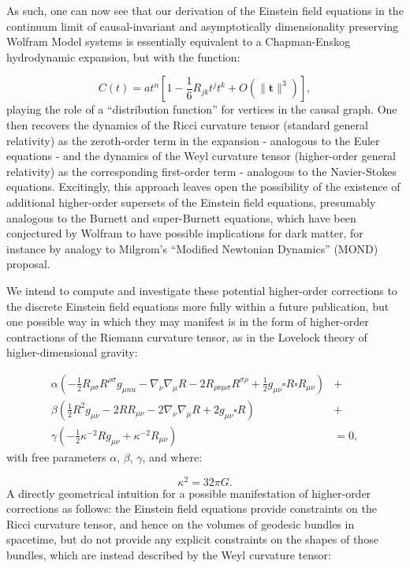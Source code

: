 \documentclass{article}
\begin{document}
As such, one can now see that our derivation of the Einstein field equations in the continuum limit of causal-invariant and asymptotically dimensionality preserving Wolfram Model systems is essentially equivalent to a Chapman-Enskog hydrodynamic expansion, but with the function:

\begin{equation}
C \left( t \right) = a t^n \left[ 1 - \frac{1}{6} R_{j k} t^j t^k + O \left( \lVert \mathbf{t} \rVert^3 \right) \right],
\end{equation}
playing the role of a ``distribution function'' for vertices in the causal graph. One then recovers the dynamics of the Ricci curvature tensor (standard general relativity) as the zeroth-order term in the expansion - analogous to the Euler equations - and the dynamics of the Weyl curvature tensor (higher-order general relativity) as the corresponding first-order term - analogous to the Navier-Stokes equations. Excitingly, this approach leaves open the possibility of the existence of additional higher-order supersets of the Einstein field equations, presumably analogous to the Burnett and super-Burnett equations, which have been conjectured by Wolfram to have possible implications for dark matter\cite{wolfram6}, for instance by analogy to Milgrom's ``Modified Newtonian Dynamics'' (MOND) proposal\cite{milgrom}.

We intend to compute and investigate these potential higher-order corrections to the discrete Einstein field equations more fully within a future publication, but one possible way in which they may manifest is in the form of higher-order contractions of the Riemann curvature tensor, as in the Lovelock theory of higher-dimensional gravity\cite{lovelock}\cite{woolliams}:

\begin{align}
\alpha \left( - \frac{1}{2} R_{\rho \sigma} R^{\rho \sigma} g_{\mu nu} - \nabla_{\nu} \nabla_{\mu} R - 2 R_{\rho \nu \mu \sigma} R^{\sigma \rho} + \frac{1}{2} g_{\mu \nu} \square R \square R_{\mu \nu} \right) &+\\
 \beta \left( \frac{1}{2} R^2 g_{\mu \nu} - 2 R R_{\mu \nu} - 2 \nabla_{\nu} \nabla_{\mu} R + 2 g_{\mu \nu} \square R \right) &+\\
 \gamma \left( - \frac{1}{2}{\kappa^{-2}} R g_{\mu \nu} + \kappa^{-2} R_{\mu \nu} \right) &= 0,
\end{align}
with free parameters ${\alpha}$, ${\beta}$, ${\gamma}$, and where:

\begin{equation}
\kappa^2 = 32 \pi G.
\end{equation}
A directly geometrical intuition for a possible manifestation of higher-order corrections as follows: the Einstein field equations provide constraints on the Ricci curvature tensor, and hence on the volumes of geodesic bundles in spacetime, but do not provide any explicit constraints on the shapes of those bundles, which are instead described by the Weyl curvature tensor\cite{hawking}\cite{danehkar}:
\end{document}
